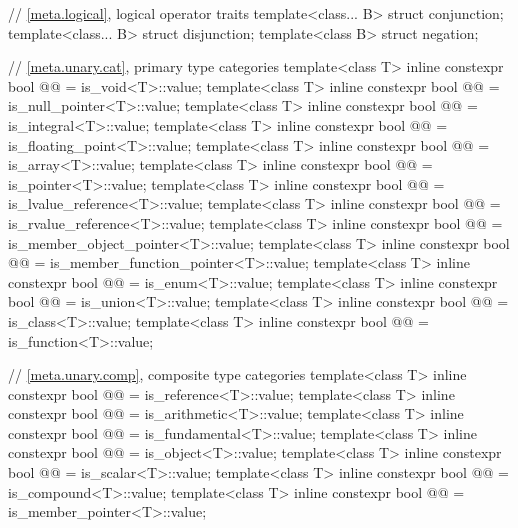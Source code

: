 \begin{codeblock}
{  // \ref{meta.logical}, logical operator traits
  template<class... B> struct conjunction;
  template<class... B> struct disjunction;
  template<class B> struct negation;

  // \ref{meta.unary.cat}, primary type categories
  template<class T>
    inline constexpr bool @@ = is_void<T>::value;
  template<class T>
    inline constexpr bool @@ = is_null_pointer<T>::value;
  template<class T>
    inline constexpr bool @@ = is_integral<T>::value;
  template<class T>
    inline constexpr bool @@ = is_floating_point<T>::value;
  template<class T>
    inline constexpr bool @@ = is_array<T>::value;
  template<class T>
    inline constexpr bool @@ = is_pointer<T>::value;
  template<class T>
    inline constexpr bool @@ = is_lvalue_reference<T>::value;
  template<class T>
    inline constexpr bool @@ = is_rvalue_reference<T>::value;
  template<class T>
    inline constexpr bool @@ = is_member_object_pointer<T>::value;
  template<class T>
    inline constexpr bool @@ = is_member_function_pointer<T>::value;
  template<class T>
    inline constexpr bool @@ = is_enum<T>::value;
  template<class T>
    inline constexpr bool @@ = is_union<T>::value;
  template<class T>
    inline constexpr bool @@ = is_class<T>::value;
  template<class T>
    inline constexpr bool @@ = is_function<T>::value;

  // \ref{meta.unary.comp}, composite type categories
  template<class T>
    inline constexpr bool @@ = is_reference<T>::value;
  template<class T>
    inline constexpr bool @@ = is_arithmetic<T>::value;
  template<class T>
    inline constexpr bool @@ = is_fundamental<T>::value;
  template<class T>
    inline constexpr bool @@ = is_object<T>::value;
  template<class T>
    inline constexpr bool @@ = is_scalar<T>::value;
  template<class T>
    inline constexpr bool @@ = is_compound<T>::value;
  template<class T>
    inline constexpr bool @@ = is_member_pointer<T>::value;

}
\end{codeblock}
